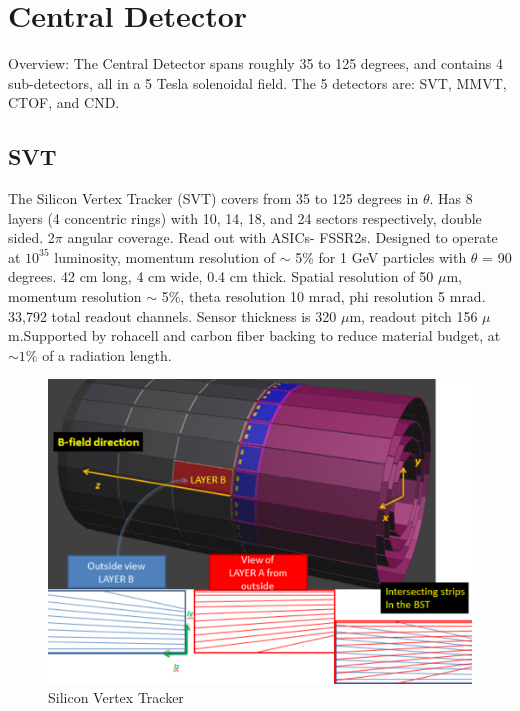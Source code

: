     \section{Central Detector}
        Overview: The Central Detector spans roughly 35 to 125 degrees, and contains 4 sub-detectors, all in a 5 Tesla solenoidal field. The 5 detectors are: SVT, MMVT, CTOF, and CND. 
        \subsection{SVT}
            The Silicon Vertex Tracker (SVT) covers from 35 to 125 degrees in $\theta$. Has 8 layers (4 concentric rings) with 10, 14, 18, and 24 sectors respectively, double sided. 2$\pi$ angular coverage. Read out with ASICs- FSSR2s. Designed to operate at $10^{35}$ luminosity, momentum resolution of $\sim$ 5\% for 1 GeV particles with $\theta$ = 90 degrees. 42 cm long, 4 cm wide, 0.4 cm thick. Spatial resolution of 50 $\mu$m, momentum resolution $\sim$ 5\%, theta resolution 10 mrad, phi resolution 5 mrad.  33,792 total readout channels. Sensor thickness is 320 $\mu$m, readout pitch 156 $\mu$ m.Supported by rohacell and carbon fiber backing to reduce material budget, at $\sim 1\%$ of a radiation length.
            
            \begin{figure}[H]
    			\centering
    			\includegraphics[width=12cm]{CLAS-12/modules/clas-12-system/pics/cd/svt.PNG}
    			\caption{Silicon Vertex Tracker}
			\end{figure}  
			
